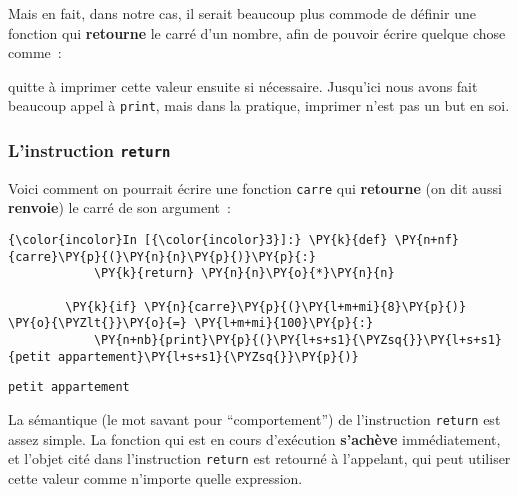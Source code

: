     Mais en fait, dans notre cas, il serait beaucoup plus commode de définir
une fonction qui \textbf{retourne} le carré d'un nombre, afin de pouvoir
écrire quelque chose comme~:

    \begin{Shaded}
\begin{Highlighting}[]
\OperatorTok{=}\NormalTok{)}
\end{Highlighting}
\end{Shaded}

    quitte à imprimer cette valeur ensuite si nécessaire. Jusqu'ici nous
avons fait beaucoup appel à \texttt{print}, mais dans la pratique,
imprimer n'est pas un but en soi.

    \hypertarget{linstruction-return}{%
\subsubsection{\texorpdfstring{L'instruction
\texttt{return}}{L'instruction return}}\label{linstruction-return}}

    Voici comment on pourrait écrire une fonction \texttt{carre} qui
\textbf{retourne} (on dit aussi \textbf{renvoie}) le carré de son
argument~:

    \begin{Verbatim}[commandchars=\\\{\}]
{\color{incolor}In [{\color{incolor}3}]:} \PY{k}{def} \PY{n+nf}{carre}\PY{p}{(}\PY{n}{n}\PY{p}{)}\PY{p}{:}
            \PY{k}{return} \PY{n}{n}\PY{o}{*}\PY{n}{n}
        
        \PY{k}{if} \PY{n}{carre}\PY{p}{(}\PY{l+m+mi}{8}\PY{p}{)} \PY{o}{\PYZlt{}}\PY{o}{=} \PY{l+m+mi}{100}\PY{p}{:}
            \PY{n+nb}{print}\PY{p}{(}\PY{l+s+s1}{\PYZsq{}}\PY{l+s+s1}{petit appartement}\PY{l+s+s1}{\PYZsq{}}\PY{p}{)}
\end{Verbatim}


    \begin{Verbatim}[commandchars=\\\{\}]
petit appartement

    \end{Verbatim}

    La sémantique (le mot savant pour ``comportement'') de l'instruction
\texttt{return} est assez simple. La fonction qui est en cours
d'exécution \textbf{s'achève} immédiatement, et l'objet cité dans
l'instruction \texttt{return} est retourné à l'appelant, qui peut
utiliser cette valeur comme n'importe quelle expression.

